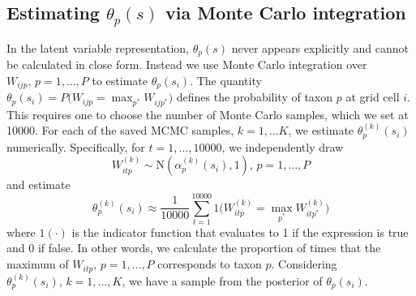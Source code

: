 \documentclass[12pt]{article}\usepackage[]{graphicx}\usepackage[]{color}
\begin{document}
\subsection{Estimating $\theta_{p}(s)$ via Monte Carlo integration}

In the latent variable representation, $\theta_{p}(s)$ never appears
explicitly and cannot be calculated in close form. Instead we use
Monte Carlo integration over $W_{ijp},\, p=1,\ldots,P$ to estimate
$\theta_{p}(s_{i})$. The quantity $\theta_{p}(s_{i})=P(W_{ijp}={\displaystyle \max_{p^{*}}W_{ijp^{*}})}$
defines the probability of taxon $p$ at grid cell $i$. This requires
one to choose the number of Monte Carlo samples, which we set at 10000.
For each of the saved MCMC samples, $k=1,\ldots K$, we estimate $\theta_{p}^{(k)}(s_{i})$
numerically. Specifically, for $t=1,\ldots,10000$, we independently
draw
\[
W_{itp}^{(k)}\sim\mbox{N}(\alpha_{p}^{(k)}(s_{i}),1),\, p=1,\ldots,P
\]
and estimate 
\[
\theta_{p}^{(k)}(s_{i})\approx\frac{1}{10000}{\displaystyle \sum_{t=1}^{10000}1(W_{itp}^{(k)}={\displaystyle \max_{p^{*}}W_{itp^{*}}^{(k)})}}
\]
where $1(\cdot)$ is the indicator function that evaluates to 1 if
the expression is true and 0 if false. In other words, we calculate
the proportion of times that the maximum of $W_{itp},\, p=1,\ldots,P$
corresponds to taxon $p$. Considering $\theta_{p}^{(k)}(s_{i}),\, k=1,\ldots,K$,
we have a sample from the posterior of $\theta_{p}(s_{i})$.
\end{document}
